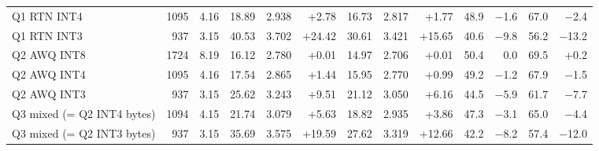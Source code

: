 \begin{table}[!htb]
\begin{adjustbox}{max width=\linewidth}
\begin{tabular}{lrrrrrrrrrrrr}
Q1 RTN INT4 & 1095 & 4.16 & 18.89 & 2.938 & +2.78 & 16.73 & 2.817 & +1.77 & 48.9 & $-$1.6 & 67.0 & $-$2.4 \\
Q1 RTN INT3 & 937 & 3.15 & 40.53 & 3.702 & +24.42 & 30.61 & 3.421 & +15.65 & 40.6 & $-$9.8 & 56.2 & $-$13.2 \\
Q2 AWQ INT8 & 1724 & 8.19 & 16.12 & 2.780 & +0.01 & 14.97 & 2.706 & +0.01 & 50.4 & 0.0 & 69.5 & +0.2 \\
Q2 AWQ INT4 & 1095 & 4.16 & 17.54 & 2.865 & +1.44 & 15.95 & 2.770 & +0.99 & 49.2 & $-$1.2 & 67.9 & $-$1.5 \\
Q2 AWQ INT3 & 937 & 3.15 & 25.62 & 3.243 & +9.51 & 21.12 & 3.050 & +6.16 & 44.5 & $-$5.9 & 61.7 & $-$7.7 \\
Q3 mixed (= Q2 INT4 bytes) & 1094 & 4.15 & 21.74 & 3.079 & +5.63 & 18.82 & 2.935 & +3.86 & 47.3 & $-$3.1 & 65.0 & $-$4.4 \\
Q3 mixed (= Q2 INT3 bytes) & 937 & 3.15 & 35.69 & 3.575 & +19.59 & 27.62 & 3.319 & +12.66 & 42.2 & $-$8.2 & 57.4 & $-$12.0 \\
\bottomrule
\end{tabular}
\end{adjustbox}
\end{table}
